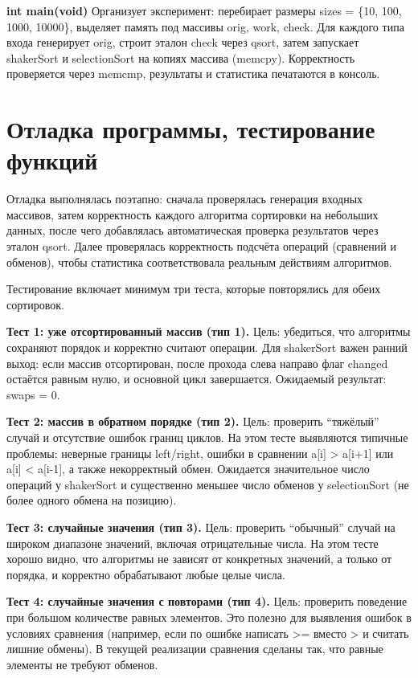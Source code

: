 \documentclass[a4paper,12pt]{article}
\newcommand{\code}[1]{{\ttfamily #1}}
\begin{document}
\textbf{\code{int main(void)}}  
Организует эксперимент: перебирает размеры \code{sizes = \{10, 100, 1000, 10000\}}, выделяет память под массивы \code{orig}, \code{work}, \code{check}. Для каждого типа входа генерирует \code{orig}, строит эталон \code{check} через \code{qsort}, затем запускает \code{shakerSort} и \code{selectionSort} на копиях массива (\code{memcpy}). Корректность проверяется через \code{memcmp}, результаты и статистика печатаются в консоль.

\section{Отладка программы, тестирование функций}

Отладка выполнялась поэтапно: сначала проверялась генерация входных массивов, затем корректность каждого алгоритма сортировки на небольших данных, после чего добавлялась автоматическая проверка результатов через эталон \code{qsort}. Далее проверялась корректность подсчёта операций (сравнений и обменов), чтобы статистика соответствовала реальным действиям алгоритмов.

Тестирование включает минимум три теста, которые повторялись для обеих сортировок.

\textbf{Тест 1: уже отсортированный массив (тип 1).}  
Цель: убедиться, что алгоритмы сохраняют порядок и корректно считают операции. Для \code{shakerSort} важен ранний выход: если массив отсортирован, после прохода слева направо флаг \code{changed} остаётся равным нулю, и основной цикл завершается. Ожидаемый результат: \code{swaps = 0}.

\textbf{Тест 2: массив в обратном порядке (тип 2).}  
Цель: проверить “тяжёлый” случай и отсутствие ошибок границ циклов. На этом тесте выявляются типичные проблемы: неверные границы \code{left/right}, ошибки в сравнении \code{a[i] > a[i+1]} или \code{a[i] < a[i-1]}, а также некорректный обмен. Ожидается значительное число операций у \code{shakerSort} и существенно меньшее число обменов у \code{selectionSort} (не более одного обмена на позицию).

\textbf{Тест 3: случайные значения (тип 3).}  
Цель: проверить “обычный” случай на широком диапазоне значений, включая отрицательные числа. На этом тесте хорошо видно, что алгоритмы не зависят от конкретных значений, а только от порядка, и корректно обрабатывают любые целые числа.

\textbf{Тест 4: случайные значения с повторами (тип 4).}  
Цель: проверить поведение при большом количестве равных элементов. Это полезно для выявления ошибок в условиях сравнения (например, если по ошибке написать \code{>=} вместо \code{>} и считать лишние обмены). В текущей реализации сравнения сделаны так, что равные элементы не требуют обменов.
\end{document}

